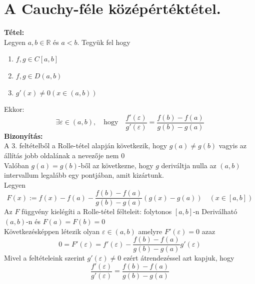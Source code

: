 \documentclass[10pt,a4paper]{article}
\newcommand{\R}{\mathbb{R}}
\newcommand{\f}[1][x]{f(#1)}
\begin{document}
\section{A Cauchy-féle középértéktétel.}
\textbf{Tétel:} \\
Legyen $a,b\in\R$ és $a<b$. Tegyük fel hogy 
\begin{enumerate}
\item $f,g\in C[a,b]$
\item $f,g\in D(a,b)$
\item $g'(x)\neq 0 (x\in (a,b))$
\end{enumerate}
Ekkor:
\[
\exists \varepsilon \in (a,b), \quad \text{hogy} \quad \frac{f'(\varepsilon)}{g'(\varepsilon)} = \frac{f(b)-f(a)}{g(b)-g(a)}
\]
\textbf{Bizonyítás:}\\
A 3. feltételből a Rolle-tétel alapján következik, hogy $g(a)\neq g(b)$ vagyis az állítás
jobb oldalának a nevezője nem $0$ \\
Valóban $g(a) = g(b)$-ből az következne, hogy $g$ deriváltja nulla az $(a,b)$ intervallum
legalább egy pontjában, amit kizártunk. \\
Legyen
\[
F(x):=\f -f(a) -\frac{f(b)-f(a)}{g(b)-g(a)}(g(x)-g(a)) \quad (x\in [a,b])
\]
Az $F$ függvény kielégíti a Rolle-tétel félteleit: folytonos $[a,b]$-n Deriválható $(a,b)$-n és $F(a)=F(b)=0$ \\
Következésképpen létezik olyan $\varepsilon \in (a,b)$ amelyre $F'(\varepsilon)=0$ azaz
\[
0=F'(\varepsilon) = f'(\varepsilon)  -\frac{f(b)-f(a)}{g(b)-g(a)} g'(\varepsilon)
\]
Mivel a feltételeink szerint $g'(\varepsilon)\neq 0$  ezért átrendezéssel azt kapjuk, hogy
\[
\frac{f'(\varepsilon)}{g'(\varepsilon)} = \frac{f(b)-f(a)}{g(b)-g(a)}
\]
\newpage 
\end{document}
